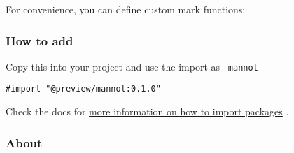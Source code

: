 \pandocbounded{}

For convenience, you can define custom mark functions:

\begin{Shaded}
\begin{Highlighting}[]

\NormalTok{$}

\NormalTok{$}
\end{Highlighting}
\end{Shaded}

\pandocbounded{}

\subsubsection{How to add}\label{how-to-add}

Copy this into your project and use the import as \texttt{\ mannot\ }

\begin{verbatim}
#import "@preview/mannot:0.1.0"
\end{verbatim}



Check the docs for
\href{https://typst.app/docs/reference/scripting/\#packages}{more
information on how to import packages} .

\subsubsection{About}\label{about}

